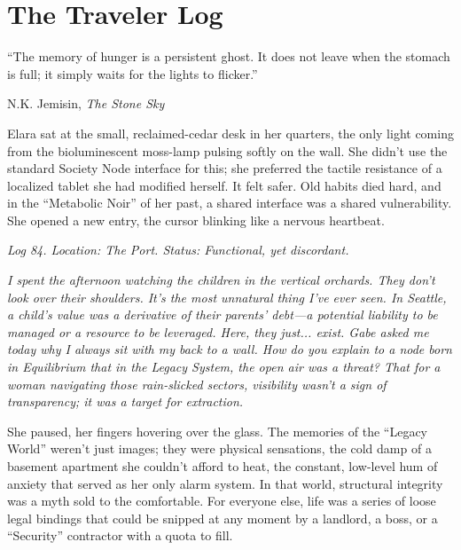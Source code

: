 \chapter{The Traveler Log}
\label{chap:04}

\epigraph{“The memory of hunger is a persistent ghost. It does not leave when the stomach is full; it simply waits for the lights to flicker.”}{N.K. Jemisin, \textit{The Stone Sky}}


Elara sat at the small, reclaimed-cedar desk in her quarters, the only light coming from the bioluminescent moss-lamp pulsing softly on the wall. She didn't use the standard Society Node interface for this; she preferred the tactile resistance of a localized tablet she had modified herself. It felt safer. Old habits died hard, and in the ``Metabolic Noir'' of her past, a shared interface was a shared vulnerability. She opened a new entry, the cursor blinking like a nervous heartbeat.

\textit{Log 84. Location: The Port. Status: Functional, yet discordant.}

\textit{I spent the afternoon watching the children in the vertical orchards. They don't look over their shoulders. It's the most unnatural thing I've ever seen. In Seattle, a child's value was a derivative of their parents' debt—a potential liability to be managed or a resource to be leveraged. Here, they just... exist. Gabe asked me today why I always sit with my back to a wall. How do you explain to a node born in Equilibrium that in the Legacy System, the open air was a threat? That for a woman navigating those rain-slicked sectors, visibility wasn't a sign of transparency; it was a target for extraction.}

She paused, her fingers hovering over the glass. The memories of the ``Legacy World'' weren't just images; they were physical sensations, the cold damp of a basement apartment she couldn't afford to heat, the constant, low-level hum of anxiety that served as her only alarm system. In that world, structural integrity was a myth sold to the comfortable. For everyone else, life was a series of loose legal bindings that could be snipped at any moment by a landlord, a boss, or a ``Security'' contractor with a quota to fill.

